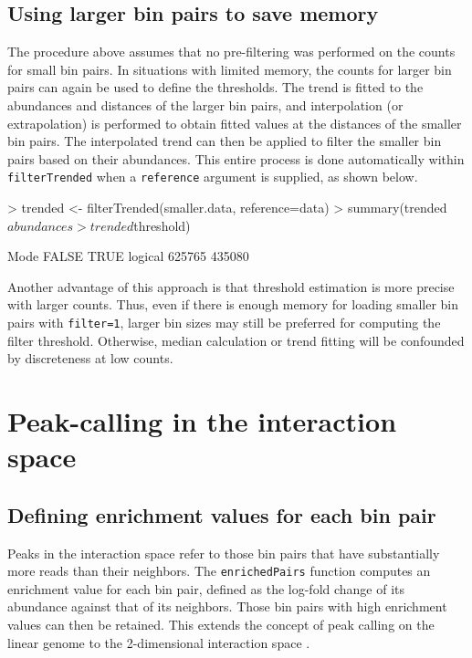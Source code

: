 \documentclass[12pt]{report}
\renewenvironment{Schunk}{\vspace{0pt}}{\vspace{0pt}}
\newcommand{\code}[1]{{\small\texttt{#1}}}
\begin{document}
\subsection{Using larger bin pairs to save memory}
The procedure above assumes that no pre-filtering was performed on the counts for small bin pairs.
In situations with limited memory, the counts for larger bin pairs can again be used to define the thresholds.
The trend is fitted to the abundances and distances of the larger bin pairs, and interpolation (or extrapolation) is performed to obtain fitted values at the distances of the smaller bin pairs.
The interpolated trend can then be applied to filter the smaller bin pairs based on their abundances.
This entire process is done automatically within \code{filterTrended} when a \code{reference} argument is supplied, as shown below.

\begin{Schunk}
\begin{Sinput}
> trended <- filterTrended(smaller.data, reference=data)
> summary(trended$abundances > trended$threshold)
\end{Sinput}
\begin{Soutput}
   Mode   FALSE    TRUE 
logical  625765  435080 
\end{Soutput}
\end{Schunk}

Another advantage of this approach is that threshold estimation is more precise with larger counts.
Thus, even if there is enough memory for loading smaller bin pairs with \code{filter=1}, larger bin sizes may still be preferred for computing the filter threshold.
Otherwise, median calculation or trend fitting will be confounded by discreteness at low counts.

\section{Peak-calling in the interaction space}

\subsection{Defining enrichment values for each bin pair}
Peaks in the interaction space refer to those bin pairs that have substantially more reads than their neighbors.
The \code{enrichedPairs} function computes an enrichment value for each bin pair, defined as the log-fold change of its abundance against that of its neighbors.
Those bin pairs with high enrichment values can then be retained.
This extends the concept of peak calling on the linear genome to the 2-dimensional interaction space \citep{rao2014kilobase}.
\end{document}
